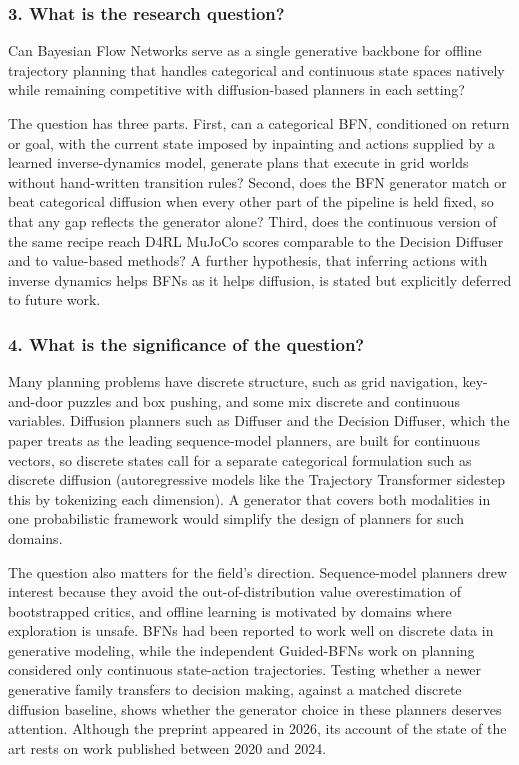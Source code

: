 \documentclass[11pt]{article}
\newcommand{\question}[1]{\subsubsection*{#1}}
\begin{document}
\question{3. What is the research question?}

Can Bayesian Flow Networks serve as a single generative backbone for offline trajectory planning that handles categorical and continuous state spaces natively while remaining competitive with diffusion-based planners in each setting?

The question has three parts. First, can a categorical BFN, conditioned on return or goal, with the current state imposed by inpainting and actions supplied by a learned inverse-dynamics model, generate plans that execute in grid worlds without hand-written transition rules? Second, does the BFN generator match or beat categorical diffusion when every other part of the pipeline is held fixed, so that any gap reflects the generator alone? Third, does the continuous version of the same recipe reach D4RL MuJoCo scores comparable to the Decision Diffuser and to value-based methods? A further hypothesis, that inferring actions with inverse dynamics helps BFNs as it helps diffusion, is stated but explicitly deferred to future work.

\question{4. What is the significance of the question?}

Many planning problems have discrete structure, such as grid navigation, key-and-door puzzles and box pushing, and some mix discrete and continuous variables. Diffusion planners such as Diffuser and the Decision Diffuser, which the paper treats as the leading sequence-model planners, are built for continuous vectors, so discrete states call for a separate categorical formulation such as discrete diffusion (autoregressive models like the Trajectory Transformer sidestep this by tokenizing each dimension). A generator that covers both modalities in one probabilistic framework would simplify the design of planners for such domains.

The question also matters for the field's direction. Sequence-model planners drew interest because they avoid the out-of-distribution value overestimation of bootstrapped critics, and offline learning is motivated by domains where exploration is unsafe. BFNs had been reported to work well on discrete data in generative modeling, while the independent Guided-BFNs work on planning considered only continuous state-action trajectories. Testing whether a newer generative family transfers to decision making, against a matched discrete diffusion baseline, shows whether the generator choice in these planners deserves attention. Although the preprint appeared in 2026, its account of the state of the art rests on work published between 2020 and 2024.
\end{document}
